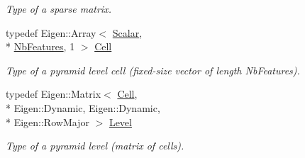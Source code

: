 \begin{DoxyCompactItemize}
\begin{DoxyCompactList}\small\item\em Type of a sparse matrix. \end{DoxyCompactList}\item 
\hypertarget{class_f_f_l_d_1_1_h_o_g_pyramid_a4d44ca52d8c41e79d36ddd6f2982ea1a}{typedef Eigen\-::\-Array$<$ \hyperlink{class_f_f_l_d_1_1_h_o_g_pyramid_af17c08ed86557e0a0aecb4814daf87c3}{Scalar}, \\*
\hyperlink{class_f_f_l_d_1_1_h_o_g_pyramid_a418ebc8cf8781a3874f50b5eac482c68}{Nb\-Features}, 1 $>$ \hyperlink{class_f_f_l_d_1_1_h_o_g_pyramid_a4d44ca52d8c41e79d36ddd6f2982ea1a}{Cell}}\label{class_f_f_l_d_1_1_h_o_g_pyramid_a4d44ca52d8c41e79d36ddd6f2982ea1a}

\begin{DoxyCompactList}\small\item\em Type of a pyramid level cell (fixed-\/size vector of length Nb\-Features). \end{DoxyCompactList}\item 
\hypertarget{class_f_f_l_d_1_1_h_o_g_pyramid_a1cd36670adf29538f44dfa434695ec34}{typedef Eigen\-::\-Matrix$<$ \hyperlink{class_f_f_l_d_1_1_h_o_g_pyramid_a4d44ca52d8c41e79d36ddd6f2982ea1a}{Cell}, \\*
Eigen\-::\-Dynamic, Eigen\-::\-Dynamic, \\*
Eigen\-::\-Row\-Major $>$ \hyperlink{class_f_f_l_d_1_1_h_o_g_pyramid_a1cd36670adf29538f44dfa434695ec34}{Level}}\label{class_f_f_l_d_1_1_h_o_g_pyramid_a1cd36670adf29538f44dfa434695ec34}

\begin{DoxyCompactList}\small\item\em Type of a pyramid level (matrix of cells). \end{DoxyCompactList}\end{DoxyCompactItemize}
